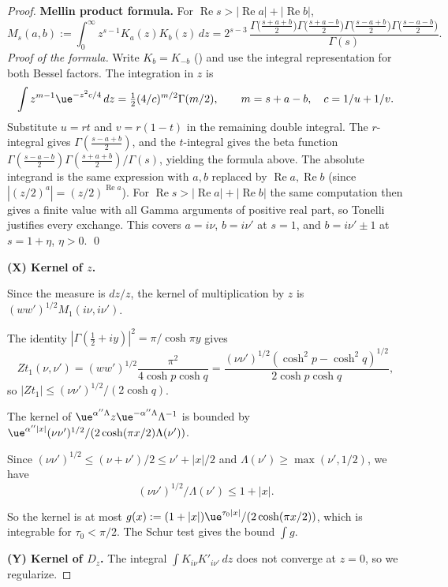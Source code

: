 \begin{proof}
\medskip\noindent\textbf{Mellin product formula.} For $\operatorname{Re}s>|\operatorname{Re}a|+|\operatorname{Re}b|$,
\[
M_s(a,b):=\int_0^\infty z^{s-1}K_a(z)K_b(z)\,dz=2^{s-3}\,\frac{\Gamma\bigl(\tfrac{s+a+b}{2}\bigr)\Gamma\bigl(\tfrac{s+a-b}{2}\bigr)\Gamma\bigl(\tfrac{s-a+b}{2}\bigr)\Gamma\bigl(\tfrac{s-a-b}{2}\bigr)}{\Gamma(s)}.
\]
\emph{Proof of the formula.} Write $K_b=K_{-b}$ (\cite[10.27.3]{DLMF}) and use the integral representation
\cite[10.32.10]{DLMF} for both Bessel factors. The integration in $z$ is
\[
\int z^{m-1}\ue^{-z^2c/4}\,dz=\tfrac12(4/c)^{m/2}\Gamma(m/2),
\qquad m=s+a-b,\quad c=1/u+1/v.
\]
Substitute $u=rt$ and $v=r(1-t)$ in the remaining double integral. The $r$-integral gives
$\Gamma(\tfrac{s-a+b}{2})$, and the $t$-integral gives the beta function
$\Gamma(\tfrac{s-a-b}{2})\Gamma(\tfrac{s+a+b}{2})/\Gamma(s)$, yielding the formula above.
The absolute integrand is the same expression with $a,b$ replaced by $\operatorname{Re}a,\operatorname{Re}b$ (since $|(z/2)^a|=(z/2)^{\operatorname{Re}a}$). For $\operatorname{Re}s>|\operatorname{Re}a|+|\operatorname{Re}b|$ the same computation then gives a finite value with all Gamma arguments of positive real part, so Tonelli justifies every exchange. This covers $a=i\nu$, $b=i\nu'$ at $s=1$, and $b=i\nu'\pm1$ at $s=1+\eta$, $\eta>0$. \qed

\medskip\noindent\textbf{(X) Kernel of $z$.}

Since the measure is $dz/z$, the kernel of multiplication by $z$ is $(w w')^{1/2}M_1(i\nu,i\nu')$.

The identity $|\Gamma(\tfrac12+iy)|^2=\pi/\cosh\pi y$ gives
\[
Zt_1(\nu,\nu')=(ww')^{1/2}\frac{\pi^2}{4\cosh p\cosh q}=\frac{(\nu\nu')^{1/2}(\cosh^2p-\cosh^2q)^{1/2}}{2\cosh p\cosh q},
\]
so $|Zt_1|\le(\nu\nu')^{1/2}/(2\cosh q)$.

The kernel of $\ue^{\alpha''\Lambda}z\ue^{-\alpha''\Lambda}\Lambda^{-1}$ is bounded by $\ue^{\alpha''|x|}(\nu\nu')^{1/2}/(2\cosh(\pi x/2)\Lambda(\nu'))$.

Since $(\nu\nu')^{1/2}\le(\nu+\nu')/2\le\nu'+|x|/2$ and $\Lambda(\nu')\ge\max(\nu',1/2)$, we have
\[
(\nu\nu')^{1/2}/\Lambda(\nu')\le1+|x|.
\]

So the kernel is at most $g(x):=(1+|x|)\ue^{\tau_0|x|}/(2\cosh(\pi x/2))$, which is integrable for $\tau_0<\pi/2$. The Schur test gives the bound $\int g$.

\medskip\noindent\textbf{(Y) Kernel of $D_z$.} The integral $\int K_{i\nu}K'_{i\nu'}\,dz$ does not converge at $z=0$, so we regularize.


\end{proof}
